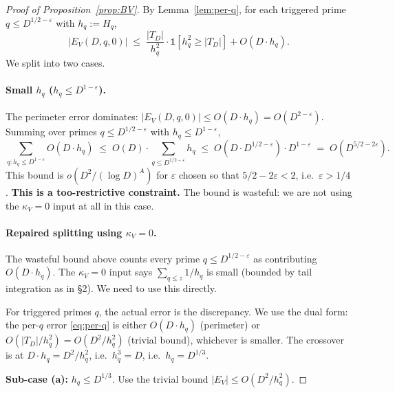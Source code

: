 \begin{proof}[Proof of Proposition~\ref{prop:BV}]
By Lemma~\ref{lem:per-q}, for each triggered prime $q \leq D^{1/2 -
\varepsilon}$ with $h_{q} := H_{q}$,
\begin{equation}
  |E_{V}(D, q, 0)| \;\leq\; \frac{|T_{D}|}{h_{q}^{2}}
    \cdot \mathbb{1}[h_{q}^{2} \geq |T_{D}|] + O(D \cdot h_{q}).
\end{equation}
We split into two cases.

\paragraph{Small $h_{q}$ ($h_{q} \leq D^{1 - \varepsilon}$).} The
perimeter error dominates: $|E_{V}(D, q, 0)| \leq O(D \cdot h_{q}) =
O(D^{2 - \varepsilon})$. Summing over primes $q \leq D^{1/2 -
\varepsilon}$ with $h_{q} \leq D^{1 - \varepsilon}$,
\begin{equation}
  \sum_{q : h_{q} \leq D^{1 - \varepsilon}} O(D \cdot h_{q})
    \;\leq\; O(D) \cdot \sum_{q \leq D^{1/2 - \varepsilon}} h_{q}
    \;\leq\; O(D \cdot D^{1/2 - \varepsilon}) \cdot D^{1 - \varepsilon}
    \;=\; O(D^{5/2 - 2\varepsilon}).
\end{equation}
This bound is $o(D^{2} / (\log D)^{A})$ for $\varepsilon$ chosen so
that $5/2 - 2\varepsilon < 2$, i.e.\ $\varepsilon > 1/4$. \textbf{This is
a too-restrictive constraint.} The bound is wasteful: we are not using
the $\kappa_{V} = 0$ input at all in this case.

\paragraph{Repaired splitting using $\kappa_{V} = 0$.} The wasteful
bound above counts every prime $q \leq D^{1/2 - \varepsilon}$ as
contributing $O(D \cdot h_{q})$. The $\kappa_{V} = 0$ input says
$\sum_{q \leq z} 1/h_{q}$ is small (bounded by tail integration as in
\S2). We need to use this directly.

For triggered primes $q$, the actual error is the discrepancy. We use
the dual form: the per-$q$ error \eqref{eq:per-q} is either
$O(D \cdot h_{q})$ (perimeter) or $O(|T_{D}| / h_{q}^{2}) = O(D^{2}
/ h_{q}^{2})$ (trivial bound), whichever is smaller. The crossover is
at $D \cdot h_{q} = D^{2} / h_{q}^{2}$, i.e.\ $h_{q}^{3} = D$, i.e.\
$h_{q} = D^{1/3}$.

\smallskip

\textbf{Sub-case (a):} $h_{q} \leq D^{1/3}$. Use the trivial bound
$|E_{V}| \leq O(D^{2} / h_{q}^{2})$.
\smallskip


\end{proof}
